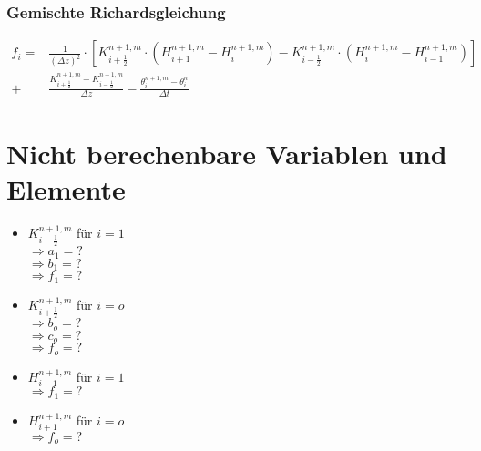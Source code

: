 \documentclass[a4paper,12pt] {article}
\begin{document}
\subsubsection{Gemischte Richardsgleichung}

\begin{equation*}
  \begin{split}
    f_i = &\frac{1}{\left(\Delta z\right)^2} \cdot \left[K_{i+\frac{1}{2}}^{n+1,m} \cdot \left(H_{i+1}^{n+1,m} - H_i^{n+1,m}\right) - K_{i-\frac{1}{2}}^{n+1,m} \cdot \left(H_{i}^{n+1,m} - H_{i-1}^{n+1,m}\right)\right] \\
    + &\frac{K_{i+\frac{1}{2}}^{n+1,m} - K_{i-\frac{1}{2}}^{n+1,m}}{\Delta z} - \frac{\theta_i^{n+1,m} - \theta_i^n}{\Delta t}
  \end{split}
\end{equation*}

\section{Nicht berechenbare Variablen und Elemente}

\begin{itemize}
\item $K_{i-\frac{1}{2}}^{n+1,m}$ für $i = 1$ \\
  $\Rightarrow a_1 = ?$ \\
  $\Rightarrow b_1 = ?$ \\
  $\Rightarrow f_1 = ?$
\item $K_{i+\frac{1}{2}}^{n+1,m}$ für $i = o$ \\
  $\Rightarrow b_o = ?$ \\
  $\Rightarrow c_o = ?$ \\
  $\Rightarrow f_o = ?$
\item $H_{i-1}^{n+1,m}$ für $i = 1$ \\
  $\Rightarrow f_1 = ?$
\item $H_{i+1}^{n+1,m}$ für $i = o$ \\
  $\Rightarrow f_o = ?$
\end{itemize}


\newpage

\printbibliography[sorting=nyt]
\end{document}
